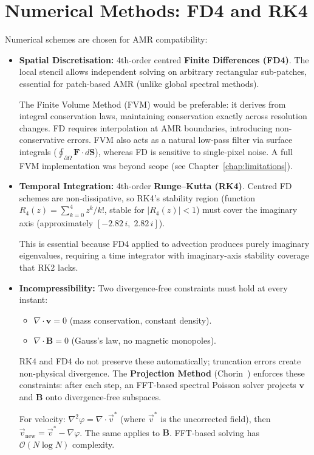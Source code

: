 \documentclass[12pt, a4paper, oneside]{report}
\begin{document}
\section{Numerical Methods: FD4 and RK4}
Numerical schemes are chosen for AMR compatibility:
\begin{itemize}
    \item \textbf{Spatial Discretisation:} 4th-order centred \textbf{Finite Differences (FD4)}. The local stencil allows independent solving on arbitrary rectangular sub-patches, essential for patch-based AMR (unlike global spectral methods).

    The Finite Volume Method (FVM) would be preferable: it derives from integral conservation laws, maintaining conservation exactly across resolution changes. FD requires interpolation at AMR boundaries, introducing non-conservative errors. FVM also acts as a natural low-pass filter via surface integrals ($\oint_{\partial\Omega} \mathbf{F} \cdot d\mathbf{S}$), whereas FD is sensitive to single-pixel noise. A full FVM implementation was beyond scope (see Chapter~\ref{chap:limitations}).

    
    \item \textbf{Temporal Integration:} 4th-order \textbf{Runge--Kutta (RK4)}. Centred FD schemes are non-dissipative, so RK4's stability region (function $R_4(z)= \sum_{k=0}^4 z^k / k!$, stable for $|R_4(z)|<1$) must cover the imaginary axis (approximately $[-2.82\,i,\; 2.82\,i]$).

    This is essential because FD4 applied to advection produces purely imaginary eigenvalues, requiring a time integrator with imaginary-axis stability coverage that RK2 lacks.

    \item \textbf{Incompressibility:} Two divergence-free constraints must hold at every instant:
    \begin{itemize}
        \item $\nabla \cdot \mathbf{v} = 0$ (mass conservation, constant density).
        \item $\nabla \cdot \mathbf{B} = 0$ (Gauss’s law, no magnetic monopoles).
    \end{itemize}
    RK4 and FD4 do not preserve these automatically; truncation errors create non-physical divergence. The \textbf{Projection Method} (Chorin~\cite{chorin1968}) enforces these constraints: after each step, an FFT-based spectral Poisson solver projects $\mathbf{v}$ and $\mathbf{B}$ onto divergence-free subspaces.

    For velocity: $\nabla^2 \varphi = \nabla \cdot \vec{v}^*$ (where $\vec{v}^*$ is the uncorrected field), then $\vec{v}_{\text{new}} = \vec{v}^* - \nabla \varphi$. The same applies to $\mathbf{B}$. FFT-based solving has $\mathcal{O}(N\log N)$ complexity.
\end{itemize}
\end{document}
